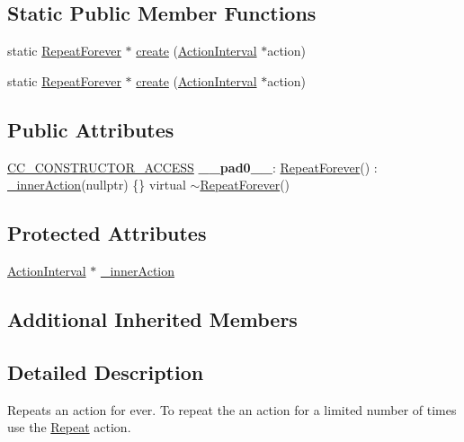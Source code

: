 \subsection*{Static Public Member Functions}
\begin{DoxyCompactItemize}
\item 
static \hyperlink{classRepeatForever}{Repeat\+Forever} $\ast$ \hyperlink{classRepeatForever_a989a199e93821bc2327f180fa7020f8e}{create} (\hyperlink{classActionInterval}{Action\+Interval} $\ast$action)
\item 
static \hyperlink{classRepeatForever}{Repeat\+Forever} $\ast$ \hyperlink{classRepeatForever_a3f601f0eeedb3a4275cf3d12001088dd}{create} (\hyperlink{classActionInterval}{Action\+Interval} $\ast$action)
\end{DoxyCompactItemize}
\subsection*{Public Attributes}
\begin{DoxyCompactItemize}
\item 
\mbox{\label{classRepeatForever_a2ccd61f91eaa3052c60f309bc1951f9e}} 
\hyperlink{_2cocos2d_2cocos_2base_2ccConfig_8h_a25ef1314f97c35a2ed3d029b0ead6da0}{C\+C\+\_\+\+C\+O\+N\+S\+T\+R\+U\+C\+T\+O\+R\+\_\+\+A\+C\+C\+E\+SS} {\bfseries \+\_\+\+\_\+pad0\+\_\+\+\_\+}\+: \hyperlink{classRepeatForever}{Repeat\+Forever}() \+: \hyperlink{classRepeatForever_ae6dc9b3dbad0a71b6610ef0d2aab77c2}{\+\_\+inner\+Action}(nullptr) \{\} virtual $\sim$\hyperlink{classRepeatForever}{Repeat\+Forever}()
\end{DoxyCompactItemize}
\subsection*{Protected Attributes}
\begin{DoxyCompactItemize}
\item 
\hyperlink{classActionInterval}{Action\+Interval} $\ast$ \hyperlink{classRepeatForever_ae6dc9b3dbad0a71b6610ef0d2aab77c2}{\+\_\+inner\+Action}
\end{DoxyCompactItemize}
\subsection*{Additional Inherited Members}


\subsection{Detailed Description}
Repeats an action for ever. To repeat the an action for a limited number of times use the \hyperlink{classRepeat}{Repeat} action. 

